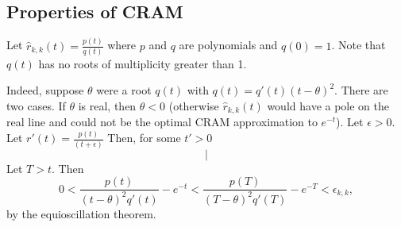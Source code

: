 \subsection{Properties of CRAM}

Let $\hat{r}_{k, k}(t)=\frac{p(t)}{q(t)}$ where $p$ and $q$ are polynomials
and $q(0) = 1$. Note that $q(t)$ has no roots of multiplicity greater than 1.

Indeed, suppose $\theta$ were a root $q(t)$ with $q(t) = q'(t)(t - \theta)^2$.
There are two cases. If $\theta$ is real, then $\theta < 0$
(otherwise $\hat{r}_{k, k}(t)$ would have a pole on the real line and could
not be the optimal CRAM approximation to $e^{-t}$). Let $\epsilon > 0$. Let
$r'(t) = \frac{p(t)}{(t + \epsilon)}$ Then,
for some $t' > 0$
\begin{equation}
|
\end{equation}
Let
$T > t$. Then
\begin{equation}
0 < \frac{p(t)}{(t - \theta)^2q'(t)} - e^{-t} < \frac{p(T)}{(T
  - \theta)^2q'(T)} - e^{-T} < \epsilon_{k, k},
\end{equation}
by the equioscillation theorem.

